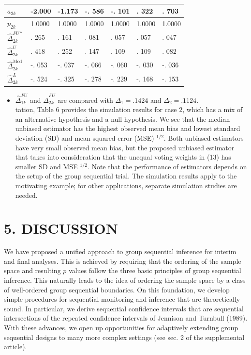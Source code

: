 \documentclass[10pt]{article}
\begin{document}
\begin{table}[h]
\begin{center}
\begin{tabular}[t]{|l|l|l|l|l|l|l|}
\hline
$a_{2 k}$ & -2.000 & -1.173 & -. 586 & -. 101 & . 322 & . 703 \\
\hline
$p_{2 k}$ & 1.0000 & 1.0000 & 1.0000 & 1.0000 & 1.0000 & 1.0000 \\
\hline
$\hat{\Delta}_{2 k}^{F U *}$ & . 265 & . 161 & . 081 & . 057 & . 057 & . 047 \\
\hline
$\hat{\Delta}_{2 k}^{U}$ & . 418 & . 252 & . 147 & . 109 & . 109 & . 082 \\
\hline
$\hat{\Delta}_{2 k}^{\text {Med }}$ & -. 053 & -. 037 & -. 066 & -. 060 & -. 030 & -. 036 \\
\hline
$\hat{\Delta}_{2 k}^{L}$ & -. 524 & -. 325 & -. 278 & -. 229 & -. 168 & -. 153 \\
\hline
\end{tabular}
\end{center}
\end{table}

\begin{itemize}
  \item $\hat{\Delta}_{1 k}^{F U}$ and $\hat{\Delta}_{2 k}^{F U}$ are compared with $\Delta_{1}=.1424$ and $\Delta_{2}=.1124$.\\
tation, Table 6 provides the simulation results for case 2, which has a mix of an alternative hypothesis and a null hypothesis. We see that the median unbiased estimator has the highest observed mean bias and lowest standard deviation (SD) and mean squared error (MSE) ${ }^{1 / 2}$. Both unbiased estimators have very small observed mean bias, but the proposed unbiased estimator that takes into consideration that the unequal voting weights in (13) has smaller SD and MSE ${ }^{1 / 2}$. Note that the performance of estimators depends on the setup of the group sequential trial. The simulation results apply to the motivating example; for other applications, separate simulation studies are needed.
\end{itemize}

\section*{5. DISCUSSION}
We have proposed a unified approach to group sequential inference for interim and final analyses. This is achieved by requiring that the ordering of the sample space and resulting $p$ values follow the three basic principles of group sequential inference. This naturally leads to the idea of ordering the sample space by a class of well-ordered group sequential boundaries. On this foundation, we develop simple procedures for sequential monitoring and inference that are theoretically sound. In particular, we derive sequential confidence intervals that are sequential intersections of the repeated confidence intervals of Jennison and Turnbull (1989). With these advances, we open up opportunities for adaptively extending group sequential designs to many more complex settings (see sec. 2 of the supplemental article).
\end{document}
